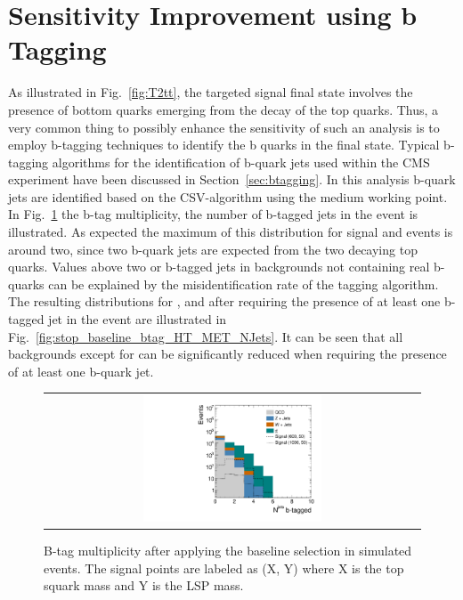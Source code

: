 \section{Sensitivity Improvement using b Tagging}
\label{sec:stop_btagging}
As illustrated in Fig.~\ref{fig:T2tt}, the targeted signal final state involves the presence of bottom quarks emerging from the decay of the top quarks. Thus, a very common thing to possibly enhance the sensitivity of such an analysis is to employ b-tagging techniques to identify the b quarks in the final state. Typical b-tagging algorithms for the identification of b-quark jets used within the CMS experiment have been discussed in Section~\ref{sec:btagging}. In this analysis b-quark jets are identified based on the CSV-algorithm using the medium working point. In Fig.~\ref{fig:stop_baseline_btag} the b-tag multiplicity, \ie the number of b-tagged jets in the event is illustrated. As expected the maximum of this distribution for signal and \ttbar events is around two, since two b-quark jets are expected from the two decaying top quarks. Values above two or b-tagged jets in backgrounds not containing real b-quarks can be explained by the misidentification rate of the tagging algorithm. \\
The resulting distributions for \HT, \met and \NJets after requiring the presence of at least one b-tagged jet in the event are illustrated in Fig.~\ref{fig:stop_baseline_btag_HT_MET_NJets}. It can be seen that all backgrounds except for \ttbar can be significantly reduced when requiring the presence of at least one b-quark jet. \\
\begin{figure}[!t]
  \centering
  \begin{tabular}{c}
                \includegraphics[width=0.49\textwidth]{figures/Stop_DeltaPhiSelection_N_jets_btagged.pdf} 
  \end{tabular}
  \caption{B-tag multiplicity after applying the baseline selection in simulated events. The signal points are labeled as (X, Y) where X is the top squark mass and Y is the LSP mass.}
  \label{fig:stop_baseline_btag}
\end{figure}
